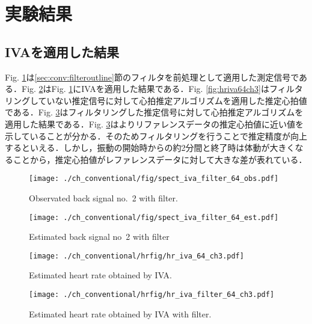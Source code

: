 \section{実験結果}
\label{sec:conv:expresult5}

\subsection{IVAを適用した結果}
\label{sec:conv:resultiva}
Fig. \ref{fig:sfiva64obs}は\ref{sec:conv:filteroutline}節のフィルタを前処理として適用した測定信号である．Fig. \ref{fig:sfiva64est}はFig. \ref{fig:sfiva64obs}にIVAを適用した結果である．Fig. \ref{fig:hriva64ch3}はフィルタリングしていない推定信号に対して心拍推定アルゴリズムを適用した推定心拍値である．Fig. \ref{fig:fhriva64ch3}はフィルタリングした推定信号に対して心拍推定アルゴリズムを適用した結果である．Fig. \ref{fig:fhriva64ch3}はよりリファレンスデータの推定心拍値に近い値を示していることが分かる．そのためフィルタリングを行うことで推定精度が向上するといえる．しかし，振動の開始時からの約2分間と終了時は体動が大きくなることから，推定心拍値がレファレンスデータに対して大きな差が表れている．

\begin{figure}[tb]
\centering
\texttt{[image: ./ch\_conventional/fig/spect\_iva\_filter\_64\_obs.pdf]}
\caption{Observated back signal no.~2 with filter.}
\label{fig:sfiva64obs}
\end{figure}

\begin{figure}[tb]
\centering
\texttt{[image: ./ch\_conventional/fig/spect\_iva\_filter\_64\_est.pdf]}
\caption{Estimated back signal no~2 with filter}
\label{fig:sfiva64est}
\end{figure}

\begin{figure}[htbp]
 \begin{minipage}{0.5\hsize}
  \begin{center}
   \texttt{[image: ./ch\_conventional/hrfig/hr\_iva\_64\_ch3.pdf]}
  \end{center}
  \caption{Estimated heart rate obtained by IVA.}
  \label{fig:hriva64ch3}
 \end{minipage}
 \begin{minipage}{0.5\hsize}
  \begin{center}
   \texttt{[image: ./ch\_conventional/hrfig/hr\_iva\_filter\_64\_ch3.pdf]}
  \end{center}
  \caption{Estimated heart rate obtained by IVA with filter.}
  \label{fig:fhriva64ch3}
 \end{minipage}
\end{figure}

